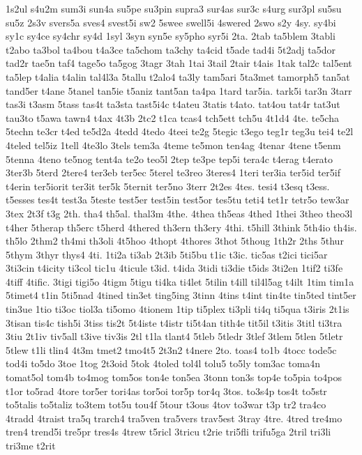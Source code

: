 {1s2ul
s4u2m
sum3i
sun4a
su5pe
su3pin
supra3
sur4as
sur3c
s4urg
sur3pl
su5su
su5z
2s3v
svers5a
sves4
svest5i
sw2
5swee
swell5i
4swered
2swo
s2y
4sy.
sy4bi
sy1c
sy4ce
sy4chr
sy4d
1syl
3syn
syn5e
sy5pho
syr5i
2ta.
2tab
ta5blem
3tabli
t2abo
ta3bol
ta4bou
t4a3ce
ta5chom
ta3chy
ta4cid
t5ade
tad4i
5t2adj
ta5dor
tad2r
tae5n
taf4
tage5o
ta5gog
3tagr
3tah
1tai
3tail
2tair
t4ais
1tak
tal2c
tal5ent
ta5lep
t4alia
t4alin
tal4l3a
5tallu
t2alo4
ta3ly
tam5ari
5ta3met
tamorph5
tan5at
tand5er
t4ane
5tanel
tan5ie
t5aniz
tant5an
ta4pa
1tard
tar5ia.
tark5i
tar3n
3tarr
tas3i
t3asm
5tass
tas4t
ta3sta
tast5i4c
t4ateu
3tatis
t4ato.
tat4ou
tat4r
tat3ut
tau3to
t5awa
tawn4
t4ax
4t3b
2tc2
t1ca
tcas4
tch5ett
tch5u
4t1d4
4te.
te5cha
5techn
te3cr
t4ed
te5d2a
4tedd
4tedo
4teei
te2g
5tegic
t3ego
teg1r
teg3u
tei4
te2l
4teled
tel5iz
1tell
4te3lo
3tels
tem3a
4teme
te5mon
ten4ag
4tenar
4tene
t5enm
5tenna
4teno
te5nog
tent4a
te2o
teo5l
2tep
te3pe
tep5i
tera4c
t4erag
t4erato
3ter3b
5terd
2tere4
ter3eb
ter5ec
5terel
te3reo
3teres4
1teri
ter3ia
ter5id
ter5if
t4erin
ter5iorit
ter3it
ter5k
5ternit
ter5no
3terr
2t2es
4tes.
tesi4
t3esq
t3ess.
t5esses
tes4t
test3a
5teste
test5er
test5in
test5or
tes5tu
teti4
tet1r
tetr5o
tew3ar
3tex
2t3f
t3g
2th.
tha4
th5al.
thal3m
4the.
4thea
th5eas
4thed
1thei
3theo
theo3l
t4her
5therap
th5erc
t5herd
4thered
th3ern
th3ery
4thi.
t5hill
3think
5th4io
th4is.
th5lo
2thm2
th4mi
th3oli
4t5hoo
4thopt
4thores
3thot
5thoug
1th2r
2ths
5thur
5thym
3thyr
thys4
4ti.
1ti2a
ti3ab
2t3ib
5ti5bu
t1ic
t3ic.
tic5as
t2ici
tici5ar
3ti3cin
t4icity
ti3col
tic1u
4ticule
t3id.
t4ida
3tidi
ti3die
t5ids
3ti2en
1tif2
ti3fe
4tiff
4tific.
3tigi
tigi5o
4tigm
5tigu
ti4ka
ti4let
5tilin
t4ill
til4l5ag
t4ilt
1tim
tim1a
5timet4
t1in
5ti5nad
4tined
tin3et
ting5ing
3tinn
4tins
t4int
tin4te
tin5ted
tint5er
tin3ue
1tio
ti3oc
tiol3a
ti5omo
4tionem
1tip
ti5plex
ti3pli
ti4q
ti5qua
t3iris
2t1is
3tisan
tis4c
tish5i
3tiss
tis2t
5t4iste
t4istr
ti5t4an
tith4e
tit5il
t3itis
3titl
ti3tra
3tiu
2t1iv
tiv5all
t3ive
tiv3is
2tl
t1la
tlant4
5tleb
5tledr
3tlef
3tlem
5tlen
5tletr
5tlew
t1li
tlin4
4t3m
tmet2
tmo4t5
2t3n2
t4nere
2to.
toas4
to1b
4tocc
tode5c
tod4i
to5do
3toe
1tog
2t3oid
5tok
4toled
tol4l
tolu5
to5ly
tom3ac
toma4n
tomat5ol
tom4b
to4mog
tom5os
ton4e
ton5ea
3tonn
ton3s
top4e
to5pia
to4pos
t1or
to5rad
4tore
tor5er
tori4as
tor5oi
tor5p
tor4q
3tos.
to3s4p
tos4t
to5str
to5talis
to5taliz
to3tem
tot5u
tou4f
5tour
t3ous
4tov
to3war
t3p
tr2
tra4co
4tradd
4traist
tra5q
trarch4
tra5ven
tra5vers
trav5est
3tray
4tre.
4tred
tre4mo
tren4
trend5i
tre5pr
tres4s
4trew
t5ricl
3tricu
t2rie
tri5fli
trifu5ga
2tril
tri3li
tri3me
t2rit
}
